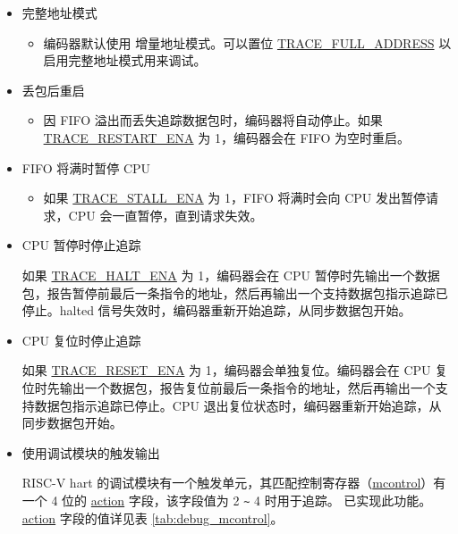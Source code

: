 \documentclass[main\_\_CN.tex]{subfiles}
\begin{document}
\begin{itemize}
    \item 完整地址模式
        \begin{itemize}
            \item 编码器默认使用 增量地址模式。可以置位 \hyperref[fielddesc:TRACEFULLADDRESS]{TRACE\_FULL\_ADDRESS} 以启用完整地址模式用来调试。
        \end{itemize}

        \item 丢包后重启
            \begin{itemize}
                \item 因 FIFO 溢出而丢失追踪数据包时，编码器将自动停止。如果 \hyperref[fielddesc:TRACERESTARTENA]{TRACE\_RESTART\_ENA} 为 1，编码器会在 FIFO 为空时重启。
            \end{itemize}

        \item FIFO 将满时暂停 CPU
            \begin{itemize}
                \item 如果 \hyperref[fielddesc:TRACESTALLENA]{TRACE\_STALL\_ENA} 为 1，FIFO 将满时会向 CPU 发出暂停请求，CPU 会一直暂停，直到请求失效。
            \end{itemize}

        \item CPU 暂停时停止追踪

            如果 \hyperref[fielddesc:TRACEHALTENA]{TRACE\_HALT\_ENA} 为 1，编码器会在 CPU 暂停时先输出一个数据包，报告暂停前最后一条指令的地址，然后再输出一个支持数据包指示追踪已停止。halted 信号失效时，编码器重新开始追踪，从同步数据包开始。

        \item CPU 复位时停止追踪

            如果 \hyperref[fielddesc:TRACERESETENA]{TRACE\_RESET\_ENA} 为 1，编码器会单独复位。编码器会在 CPU 复位时先输出一个数据包，报告复位前最后一条指令的地址，然后再输出一个支持数据包指示追踪已停止。CPU 退出复位状态时，编码器重新开始追踪，从同步数据包开始。

        \item 使用调试模块的触发输出

            RISC-V hart 的调试模块有一个触发单元，其匹配控制寄存器（\hyperref[regdesc:MCONTROL]{mcontrol}）有一个 4 位的 \hyperref[fielddesc:MCONTROLACTION]{action} 字段，该字段值为 2 \verb+~+ 4 时用于追踪。\chipname{} 已实现此功能。\hyperref[fielddesc:MCONTROLACTION]{action} 字段的值详见表 \ref{tab:debug_mcontrol}。


\end{itemize}
\end{document}
